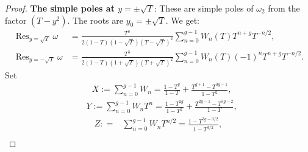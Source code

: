 \documentclass[11pt]{amsart}
\theoremstyle{definition}
\begin{document}
\begin{proof}
\textbf{ The simple poles at $y = \pm \sqrt{T}$}:
These are simple poles of $\omega_2$ from the factor $(T-y^2)$. The roots are $y_0 = \pm \sqrt{T}$. We get:
\begin{align*}
\operatorname{Res}_{y=\sqrt{T}} \omega &= \frac{T^3}{2(1-T)(1-\sqrt{T})(T-\sqrt{T})^2} \sum_{n=0}^{g-1} W_n(T) T^{n+g} T^{-n/2}, \\
\operatorname{Res}_{y=-\sqrt{T}} \omega &= \frac{T^3}{2(1-T)(1+\sqrt{T})(T+\sqrt{T})^2} \sum_{n=0}^{g-1} W_n(T) (-1)^n T^{n+g} T^{-n/2}.
\end{align*}
Set
\begin{equation*} \begin{aligned}
&X :=\sum_{n=0}^{g-1} W_n =  \frac{1-T^g}{1-T}+\frac{T^{g+1}-T^{3g-1}}{1-T^2},\end{aligned}\end{equation*} \begin{equation*} \begin{aligned}
&Y :=\sum_{n=0}^{g-1}W_nT^n= \frac{1-T^{2g}}{1-T^2}+\frac{T^{2g-1}-T^{3g-2}}{1-T}, \end{aligned} \end{equation*} \begin{equation*} \begin{aligned}
Z: = &\sum_{n=0}^{g-1}W_n T^{n/2} = \frac{1-T^{3g-3/2}}{1-T^{3/2}}, \end{aligned}\end{equation*} \begin{equation*} \begin{aligned}

\end{aligned}
\end{equation*}
\end{proof}
\end{document}
